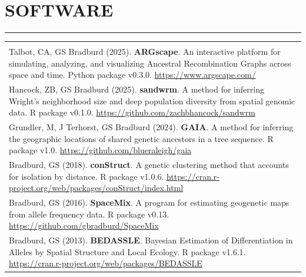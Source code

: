 \documentclass{gbcv}
\begin{document}
\section*{SOFTWARE}
\vspace{-0.6cm}
\rule{470pt}{0.4pt}
\begin{tabular}{>{\everypar{\hangindent1cm}}p{}}
\hfill\\
Talbot, CA, GS Bradburd (2025). \textbf{ARGscape}. An interactive platform for simulating, analyzing, 
and visualizing Ancestral Recombination Graphs across space and time. Python package v0.3.0.
\href{https://www.argscape.com/}{https://www.argscape.com/}\\
%
\vspace{-0.01cm}
%
Hancock, ZB, GS Bradburd (2025). \textbf{sandwrm}. A method for inferring Wright's neighborhood size 
and deep population diversity from spatial genomic data. R package v0.1.0.
\href{https://github.com/zachbhancock/sandwrm}{https://github.com/zachbhancock/sandwrm}\\
%
\vspace{-0.01cm}
%
Grundler, M, J Terhorst, GS Bradburd (2024). \textbf{GAIA}. A method for inferring the geographic locations of 
shared genetic ancestors in a tree sequence. R package v1.0.
\href{https://github.com/blueraleigh/gaia}{https://github.com/blueraleigh/gaia}\\
%
\vspace{-0.01cm}
%
Bradburd, GS (2018). \textbf{conStruct}. A genetic clustering method that accounts for isolation by distance. R package v1.0.6.
\href{https://cran.r-project.org/web/packages/conStruct/index.html}{https://cran.r-project.org/web/packages/conStruct/index.html}\\
%
\vspace{-0.01cm}
%
Bradburd, GS (2016). \textbf{SpaceMix}. A program for estimating geogenetic maps from allele frequency data. R package v0.13.
\href{https://github.com/gbradburd/SpaceMix}{https://github.com/gbradburd/SpaceMix}\\
%
\vspace{-0.01cm}
%
Bradburd, GS (2013). \textbf{BEDASSLE}. Bayesian Estimation of Differentiation in Alleles by Spatial Structure and Local Ecology. 
R package v1.6.1. \href{https://cran.r-project.org/web/packages/BEDASSLE}{https://cran.r-project.org/web/packages/BEDASSLE}\\
%
\end{tabular}

\vspace{0.2cm}
\end{document}
